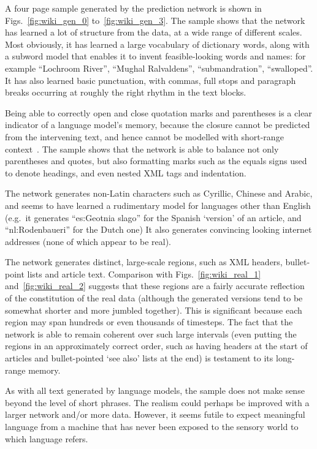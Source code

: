 \documentclass{article}
\newcommand{\eg}{e.g.\ }
\begin{document}
A four page sample generated by the prediction network is shown in Figs.~\ref{fig:wiki_gen_0} to~\ref{fig:wiki_gen_3}.
The sample shows that the network has learned a lot of structure from the data, at a wide range of different scales.
Most obviously, it has learned a large vocabulary of dictionary words, along with a subword model that enables it to invent feasible-looking words and names: for example ``Lochroom River'', ``Mughal Ralvaldens'', ``submandration'', ``swalloped''.
It has also learned basic punctuation, with commas, full stops and paragraph breaks occurring at roughly the right rhythm in the text blocks.

Being able to correctly open and close quotation marks and parentheses is a clear indicator of a language model's memory, because the closure cannot be predicted from the intervening text, and hence cannot be modelled with short-range context~\cite{sutskever11rnn}.
The sample shows that the network is able to balance not only parentheses and quotes, but also formatting marks such as the equals signs used to denote headings, and even nested XML tags and indentation.

The network generates non-Latin characters such as Cyrillic, Chinese and Arabic, and seems to have learned a rudimentary model for languages other than English (\eg it generates ``es:Geotnia slago'' for the Spanish `version' of an article, and ``nl:Rodenbaueri'' for the Dutch one)
It also generates convincing looking internet addresses (none of which appear to be real). 

The network generates distinct, large-scale regions, such as XML headers, bullet-point lists and article text.
Comparison with Figs.~\ref{fig:wiki_real_1} and~\ref{fig:wiki_real_2} suggests that these regions are a fairly accurate reflection of the constitution of the real data (although the generated versions tend to be somewhat shorter and more jumbled together).
This is significant because each region may span hundreds or even thousands of timesteps. 
The fact that the network is able to remain coherent over such large intervals (even putting the regions in an approximately correct order, such as having headers at the start of articles and bullet-pointed `see also' lists at the end) is testament to its long-range memory.

As with all text generated by language models, the sample does not make sense beyond the level of short phrases.
The realism could perhaps be improved with a larger network and/or more data.
However, it seems futile to expect meaningful language from a machine that has never been exposed to the sensory world to which language refers.
\end{document}
